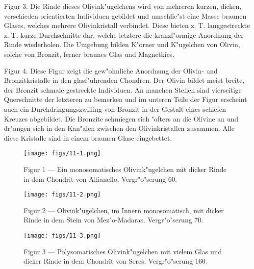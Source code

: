 \documentclass[a4paper, 11pt, oneside, polutonikogreek, german]{article}
\begin{document}
Figur 3. Die Rinde dieses Olivink"ugelchens wird von mehreren kurzen, dicken, verschieden orientierten Individuen gebildet und umschlie"st eine Masse braunen Glases, welches mehrere Olivinkristall verbindet. Diese bieten z. T. langgestreckte z. T. kurze Durchschnitte dar, welche letztere die kranzf"ormige Anordnung der Rinde wiederholen. Die Umgebung bilden K"orner und K"ugelchen von Olivin, solche von Bronzit, ferner braunes Glas und Magnetkies.

Figur 4. Diese Figur zeigt die gew"ohnliche Anordnung der Olivin- und Bronzitkristalle in den glasf"uhrenden Chondren. Der Olivin bildet meist breite, der Bronzit schmale gestreckte Individuen. An manchen Stellen sind vierseitige Querschnitte der letzteren zu bemerken und im unteren Teile der Figur erscheint auch ein Durchdringungszwilling von Bronzit in der Gestalt eines schiefen Kreuzes abgebildet. Die Bronzite schmiegen sich "ofters an die Olivine an und dr"angen sich in den Kan"alen zwischen den Olivinkristallen zusammen. Alle diese Kristalle sind in einem braunen Glase eingebettet.
\clearpage

\vspace*{\fill}
\begin{figure}[H]
\centering
\texttt{[image: figs/11-1.png]}
\caption{\small Figur 1 --- Ein monosomatisches Olivink"ugelchen mit dicker Rinde in dem Chondrit von Alfianello. Vergr"o"serung 60.}
\end{figure}
\vspace*{\fill}
\clearpage

\vspace*{\fill}
\begin{figure}[H]
\centering
\texttt{[image: figs/11-2.png]}
\caption{\small Figur 2 --- Olivink"ugelchen, im Innern monosomatisch, mit dicker Rinde in dem Stein von Mez"o-Madaras. Vergr"o"serung 70.}
\end{figure}
\vspace*{\fill}
\clearpage

\vspace*{\fill}
\begin{figure}[H]
\centering
\texttt{[image: figs/11-3.png]}
\caption{\small Figur 3 --- Polysomatisches Olivink"ugelchen mit vielem Glas und dicker Rinde in dem Chondrit von Seres. Vergr"o"serung 160.}
\end{figure}
\vspace*{\fill}
\clearpage
\end{document}
